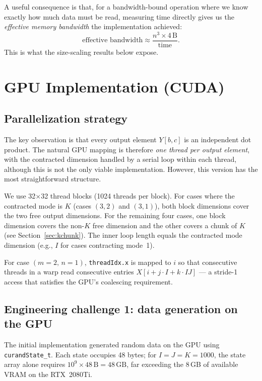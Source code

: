 \documentclass[11pt]{article}
\begin{document}
A useful consequence is that, for a bandwidth-bound operation where we know
exactly how much data must be read, measuring time directly gives us the
\emph{effective memory bandwidth} the implementation achieved:
\[
  \text{effective bandwidth} \approx \frac{n^3 \times 4\,\text{B}}{\text{time}}.
\]
This is what the size-scaling results below expose.

\section{GPU Implementation (CUDA)}

\subsection{Parallelization strategy}

The key observation is that every output element $Y[b,c]$ is an
independent dot product.  The natural GPU mapping is therefore
\emph{one thread per output element}, with the contracted dimension
handled by a serial loop within each thread, although this is not the only viable implementation.
However, this version has the most straightforward structure.

We use 32$\times$32 thread blocks (1024 threads per block).  For cases
where the contracted mode is $K$ (cases $(3,2)$ and $(3,1)$), both
block dimensions cover the two free output dimensions.  For the remaining
four cases, one block dimension covers the non-$K$ free dimension and
the other covers a chunk of $K$ (see Section~\ref{sec:kchunk}).
The inner loop length equals the contracted mode dimension (e.g., $I$
for cases contracting mode~1).

For case $(m{=}2,\,n{=}1)$, \texttt{threadIdx.x} is mapped to $i$ so
that consecutive threads in a warp read consecutive entries
$X[i{+}j\cdot I{+}k\cdot IJ]$ --- a stride-1 access that satisfies
the GPU's coalescing requirement.

\subsection{Engineering challenge 1: data generation on the GPU}

The initial implementation generated random data on the GPU using
\texttt{curandState\_t}.  Each state occupies 48 bytes; for
$I{=}J{=}K{=}1000$, the state array alone requires
$10^9 \times 48\,\text{B} = 48\,\text{GB}$, far exceeding the 8\,GB of
available VRAM on the RTX~2080Ti.
\end{document}
